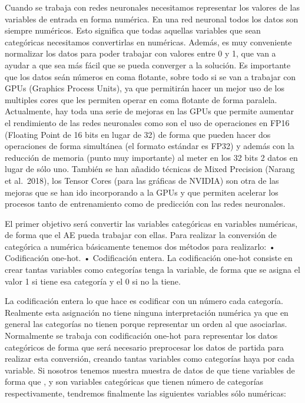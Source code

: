 \documentclass[
  a4paper,
  DIV=11,
  numbers=noendperiod]{scrreprt}
\begin{document}
Cuando se trabaja con redes neuronales necesitamos representar los
valores de las variables de entrada en forma numérica. En una red
neuronal todos los datos son siempre numéricos. Esto significa que todas
aquellas variables que sean categóricas necesitamos convertirlas en
numéricas. Además, es muy conveniente normalizar los datos para poder
trabajar con valores entre 0 y 1, que van a ayudar a que sea más fácil
que se pueda converger a la solución. Es importante que los datos seán
números en coma flotante, sobre todo si se van a trabajar con GPUs
(Graphics Process Units), ya que permitirán hacer un mejor uso de los
multiples cores que les permiten operar en coma flotante de forma
paralela. Actualmente, hay toda una serie de mejoras en las GPUs que
permite aumentar el rendimiento de las redes neuronales como son el uso
de operaciones en FP16 (Floating Point de 16 bits en lugar de 32) de
forma que pueden hacer dos operaciones de forma simultánea (el formato
estándar es FP32) y además con la reducción de memoria (punto muy
importante) al meter en los 32 bits 2 datos en lugar de sólo uno.
También se han añadido técnicas de Mixed Precision (Narang et al.~2018),
los Tensor Cores (para las gráficas de NVIDIA) son otra de las mejoras
que se han ido incorporando a la GPUs y que permiten acelerar los
procesos tanto de entrenamiento como de predicción con las redes
neuronales.

El primer objetivo será convertir las variables categóricas en variables
numéricas, de forma que el AE pueda trabajar con ellas. Para realizar la
conversión de categórica a numérica básicamente tenemos dos métodos para
realizarlo: • Codificación one-hot. • Codificación entera. La
codificación one-hot consiste en crear tantas variables como categorías
tenga la variable, de forma que se asigna el valor 1 si tiene esa
categoría y el 0 si no la tiene.

La codificación entera lo que hace es codificar con un número cada
categoría. Realmente esta asignación no tiene ninguna interpretación
numérica ya que en general las categorías no tienen porque representar
un orden al que asociarlas. Normalmente se trabaja con codificación
one-hot para representar los datos categóricos de forma que será
necesario preprocesar los datos de partida para realizar esta
conversión, creando tantas variables como categorías haya por cada
variable. Si nosotros tenemos nuestra muestra de datos de que tiene
variables de forma que , y son variables categóricas que tienen número
de categorías respectivamente, tendremos finalmente las siguientes
variables sólo numéricas:
\end{document}
